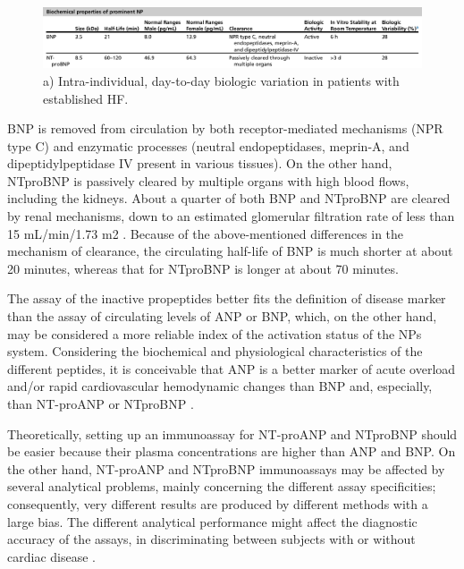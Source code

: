 \documentclass[14pt,a4paper,onecolumn]{extarticle}
\begin{document}
\begin{figure}   \includegraphics{../../images/NP_biochem.png}   \caption{a) Intra-individual, day-to-day biologic variation in patients with established HF. \citep{Gaggin2014}}   \label{NP_biochem} \end{figure}

BNP is removed from circulation by both receptor-mediated mechanisms (NPR type C) and enzymatic processes (neutral endopeptidases, meprin-A, and dipeptidylpeptidase IV present in various tissues). On the other hand, NTproBNP is passively cleared by multiple organs with high blood flows, including the kidneys. About a quarter of both BNP and NTproBNP are cleared by renal mechanisms, down to an estimated glomerular filtration rate of less than 15 mL/min/1.73 m2 . Because of the above-mentioned differences in the mechanism of clearance, the circulating half-life of BNP is much shorter at about 20 minutes, whereas that for NTproBNP is longer at about 70 minutes. \citep{Gaggin2014}

The assay of the inactive propeptides better fits the definition of disease marker than the assay of circulating levels of ANP or BNP, which, on the other hand, may be considered a more reliable index of the activation status of the NPs system. Considering the biochemical and physiological characteristics of the different peptides, it is conceivable that ANP is a better marker of acute overload and/or rapid cardiovascular hemodynamic changes than BNP and, especially, than NT-proANP or NTproBNP \citep{bib32} \citep{bib35}. %

Theoretically, setting up an immunoassay for NT-proANP and NTproBNP should be easier because their plasma concentrations are higher than ANP and BNP.  On the other hand, NT-proANP and NTproBNP immunoassays may be affected by several analytical problems, mainly concerning the different assay specificities; consequently, very different results are produced by different methods with a large bias. The different analytical performance might affect the diagnostic accuracy of the assays, in discriminating between subjects with or without cardiac disease \citep{bib32} \citep{bib35} \citep{bib36}. %
\end{document}

